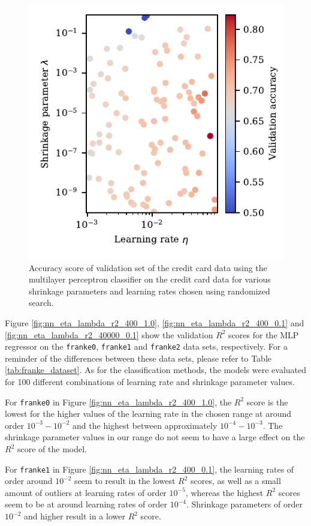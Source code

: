 \documentclass[a4paper, 11pt, twocolumn]{article}
\begin{document}
\begin{figure}[H]
	\includegraphics[scale=1]{figures/nn_learning_rate_lambda_accuracy_credit.pdf}
	\caption{Accuracy score of validation set of the credit card data using the
	multilayer perceptron classifier on the credit card data for various shrinkage
	parameters and learning rates chosen using randomized search.}
	\label{fig:nn_eta_lambda_credit_accuracy}
\end{figure}

Figure \ref{fig:nn_eta_lambda_r2_400_1.0}, \ref{fig:nn_eta_lambda_r2_400_0.1} and
\ref{fig:nn_eta_lambda_r2_40000_0.1} show the validation $R^2$ scores for the MLP
regressor on the \texttt{franke0}, \texttt{franke1} and \texttt{franke2} data
sets, respectively. For a reminder of the differences between these data sets,
please refer to Table \ref{tab:franke_dataset}. As for the classification methods,
the models were evaluated for 100 different combinations of learning rate and
shrinkage parameter values.

\noindent For \texttt{franke0} in Figure
\ref{fig:nn_eta_lambda_r2_400_1.0}, the $R^2$ score is the lowest for the higher
values of the learning rate in the chosen range at around order $10^{-3}-10^{-2}$
and the highest between approximately $10^{-4}-10^{-3}$. The shrinkage parameter
values in our range do not seem to have a large effect on the $R^2$ score of the
model.

\noindent For \texttt{franke1} in Figure \ref{fig:nn_eta_lambda_r2_400_0.1}, the
learning rates of order around $10^{-2}$ seem to result in the lowest $R^2$
scores, as well as a small amount of outliers at learning rates of order $10^{-5}$,   whereas the highest $R^2$ scores seem to be at around learning rates of order
$10^{-4}$. Shrinkage parameters of order $10^{-2}$ and higher result in a lower
$R^2$ score.
\end{document}
